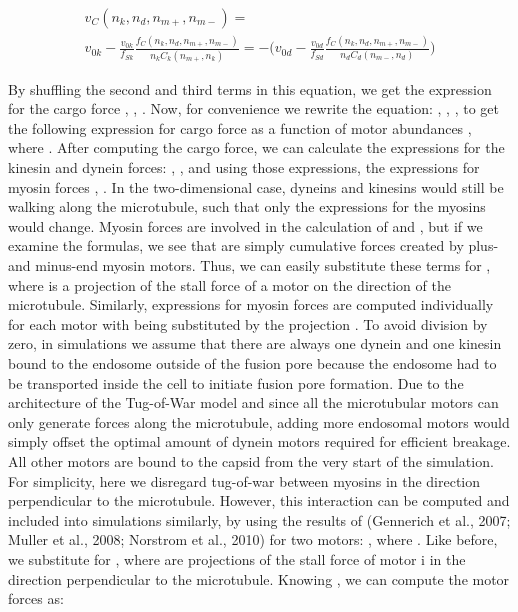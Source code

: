 \begin{equation}
\begin{split}
v_C(n_k, n_d, n_{m+}, n_{m-}) =\\ v_{0k}-\frac{v_{0k}}{f_{Sk}}\frac{f_C(n_k, n_d, n_{m+}, n_{m-})}{n_kC_k(n_{m+}, n_k)} =
-\big(v_{0d}-\frac{v_{0d}}{f_{Sd}}\frac{f_C(n_k, n_d, n_{m+}, n_{m-})}{n_dC_d(n_{m-},n_d)}\big)
\end{split}
\end{equation}


By shuffling the second and third terms in this equation, we get the expression for the cargo force
 ,
 ,
 .
Now, for convenience we rewrite the equation:
 ,
 ,
 ,
to get the following expression for cargo force as a function of motor abundances
 , 
where
 .
After computing the cargo force, we can calculate the expressions for the kinesin and dynein forces:
 ,  ,
and using those expressions, the expressions for myosin forces
 ,  .
In the two-dimensional case, dyneins and kinesins would still be walking along the microtubule, such that only the expressions for the myosins would change. Myosin forces are involved in the calculation of   and  , but if we examine the formulas, we see that   are simply cumulative forces created by plus- and minus-end myosin motors. Thus, we can easily substitute these terms for  , where   is a projection of the stall force of a motor   on the direction of the microtubule. Similarly, expressions for myosin forces are computed individually for each motor with   being substituted by the projection .
To avoid division by zero, in simulations we assume that there are always one dynein and one kinesin bound to the endosome outside of the fusion pore because the endosome had to be transported inside the cell to initiate fusion pore formation. Due to the architecture of the Tug-of-War model and since all the microtubular motors can only generate forces along the microtubule, adding more endosomal motors would simply offset the optimal amount of dynein motors required for efficient breakage. All other motors are bound to the capsid from the very start of the simulation.
For simplicity, here we disregard tug-of-war between myosins in the direction perpendicular to the microtubule. However, this interaction can be computed and included into simulations similarly, by using the results of (Gennerich et al., 2007; Muller et al., 2008; Norstrom et al., 2010) for two motors:
 , where  .
Like before, we substitute   for  , where   are projections of the stall force of motor i in the direction perpendicular to the microtubule. Knowing  , we can compute the motor forces as:
